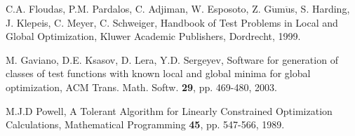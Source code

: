 \documentclass[symmetry,article,submit,moreauthors,pdftex]{Definitions/mdpi}
\begin{document}
\begin{thebibliography}{10}
C.A. Floudas, P.M. Pardalos, C. Adjiman, W. Esposoto,
Z. G$\ddot{\mbox{u}}$m$\ddot{\mbox{u}}$s, S. Harding, J. Klepeis,
C. Meyer, C. Schweiger, Handbook of Test Problems in Local and Global
Optimization, Kluwer Academic Publishers, Dordrecht, 1999.

M. Gaviano, D.E. Ksasov, D. Lera, Y.D. Sergeyev, Software
for generation of classes of test functions with known local and global
minima for global optimization, ACM Trans. Math. Softw. \textbf{29},
pp. 469-480, 2003.

M.J.D Powell, A Tolerant Algorithm for Linearly Constrained
Optimization Calculations, Mathematical Programming \textbf{45}, pp.
547-566, 1989. 
\end{thebibliography}
\end{document}
